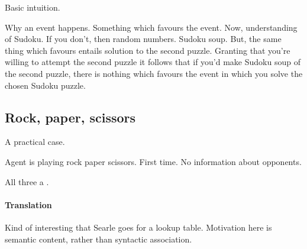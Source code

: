 \begin{note}
  Basic intuition.

  Why an event happens.
  Something which favours the event.
  Now, understanding of Sudoku.
  If you don't, then random numbers.
  Sudoku soup.
  But, the same thing which favours entails solution to the second puzzle.
  Granting that you're willing to attempt the second puzzle it follows that if you'd make Sudoku soup of the second puzzle, there is nothing which favours the event in which you solve the chosen Sudoku puzzle.
\end{note}


\subsection{Rock, paper, scissors}


\begin{note}
  A practical case.

  \begin{scenario}
    Agent is playing rock paper scissors.
    First time.
    No information about opponents.

    All three a .
  \end{scenario}
\end{note}




\paragraph*{Translation}


\begin{note}
  Kind of interesting that Searle goes for a lookup table.
  Motivation here is semantic content, rather than syntactic association.
\end{note}


